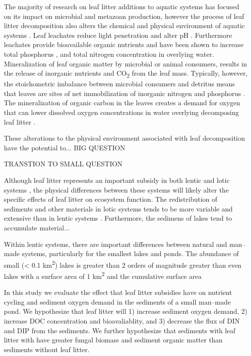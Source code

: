 The majority of research on leaf litter additions to aquatic systems has focused on its impact on microbial and metazoan production, however the process of leaf litter decomposition also alters the chemical and physical environment of aquatic systems \cite{Gessner_1999}. Leaf leachates reduce light penetration \cite{CITE} and alter pH \cite{CITE}. Furthermore leachates provide bioavailable organic nutrients \cite{McConnell_1968,Duan_2014} and have been shown to increase total phosphorus \cite{Feh_2015b}, and total nitrogen \cite{Feh_2015} concentration in overlying water. Mineralization of leaf organic matter by microbial or animal consumers, results in the release of inorganic nutrients and CO\textsubscript{2} \cite{CITE} from the leaf mass. Typically, however, the stoichometric imbalance between microbial consumers and detritus means that leaves are sites of net immobilization of inorganic nitrogen and phosphorus \cite{CITE}. The mineralization of organic carbon in the leaves creates a demand for oxygen \cite{CITE} that can lower dissolved oxygen concentrations in water overlying decomposing leaf litter \cite{Hodkinson_1975,Rubbo_2008,Mehring_2014,Feh_2015b}.

These alterations to the physical environment associated with leaf decomposition have the potential to... BIG QUESTION

TRANSTION TO SMALL QUESTION

Although leaf litter represents an important subsidy in both lentic and lotic systems \cite{Webster_1986}, the physical differences between these systems will likely alter the specific effects of leaf litter on ecosystem function. The redistribution of sediments and other materials in lotic systems tends to be more variable and extensive than in lentic systems \cite{Wetzel_2001}. Furthermore, the sedimens of lakes tend to accumulate material...

Within lentic systems, there are important differences between natural and man--made systems, particularly for the smallest lakes and ponds. The abundance of small (< 0.1 km\textsuperscript{2}) lakes is greater than 2 orders of magnitude greater than even lakes with a surface area of 1 km\textsuperscript{2} \cite{2010} and the cumulative surface area 

In this study we evaluate the effect that leaf litter subsidies have on nutrient cycling and sediment oxygen demand in the sediments of a small man--made pond. We hypothesize that leaf litter will 1) increase sediment oxygen demand, 2) increase DOC concentration and bioavaliablity, and 3) decrease the flux of DIN and DIP from the sediments. We further hypothesize that sediments with leaf litter with have greater fungal biomass and sediment organic matter than sediments without leaf litter.